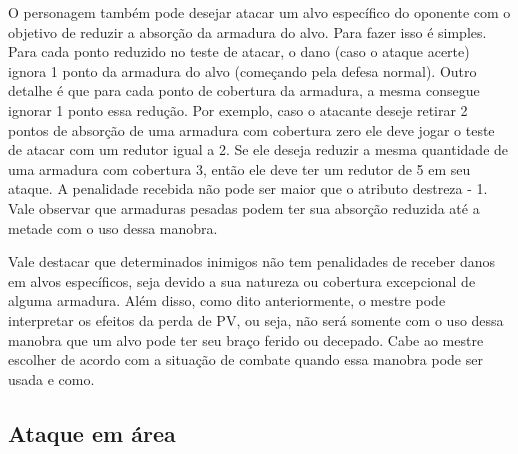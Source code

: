 
O personagem também pode desejar atacar um alvo específico do oponente com o objetivo de reduzir a absorção da armadura do alvo. Para fazer isso é simples. Para cada ponto reduzido no teste de atacar, o dano (caso o ataque acerte) ignora 1 ponto da armadura do alvo (começando pela defesa normal). Outro detalhe é que para cada ponto de cobertura da armadura, a mesma consegue ignorar 1 ponto essa redução. Por exemplo, caso o atacante deseje retirar 2 pontos de absorção de uma armadura com cobertura zero ele deve jogar o teste de atacar com um redutor igual a 2. Se ele deseja reduzir a mesma quantidade de uma armadura com cobertura 3, então ele deve ter um redutor de 5 em seu ataque. A penalidade recebida não pode ser maior que o atributo destreza - 1. Vale observar que armaduras pesadas podem ter sua absorção reduzida até a metade com o uso dessa manobra.



Vale destacar que determinados inimigos não tem penalidades de receber danos em alvos específicos, seja devido a sua natureza ou cobertura excepcional de alguma armadura. Além disso, como dito anteriormente, o mestre pode interpretar os efeitos da perda de PV, ou seja, não será somente com o uso dessa manobra que um alvo pode ter seu braço ferido ou decepado. Cabe ao mestre escolher de acordo com a situação de combate quando essa manobra pode ser usada e como.

\subsection{Ataque em área}

